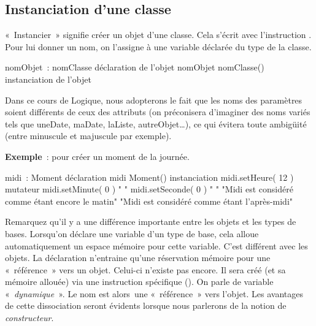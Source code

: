 	\subsection{Instanciation d'une classe}
	
		«~Instancier~» signifie créer un objet d'une classe.
		Cela s'écrit avec l'instruction
		. 
		Pour lui donner un nom, 
		on l'assigne à une variable déclarée du type de la
		classe.

		\begin{Pseudocode}
			\Decl nomObjet~: nomClasse 
			\RComment déclaration de l'objet
			\Let nomObjet \Gets {} nomClasse() 
			\RComment instanciation de l'objet
		\end{Pseudocode}

		Dans ce cours de Logique, nous adopterons le fait que 
		les noms des paramètres soient différents de ceux des 
		attributs (on préconisera d’imaginer des noms variés tels 
		que uneDate, maDate, laListe, autreObjet…), ce qui évitera 
		toute ambigüité (entre minuscule et majuscule par exemple).

		\textbf{Exemple}~: pour créer un moment de la journée.
		
		\begin{Pseudocode}
			\Module{test}{}{}
				\Decl midi~: Moment
				\RComment déclaration
				\Let midi \Gets \K{nouveau} Moment()
				\RComment instanciation
				\Stmt midi.setHeure( 12 )
				\RComment mutateur
				\Stmt midi.setMinute( 0 )
				\RComment " "
				\Stmt midi.setSeconde( 0 )
				\RComment " "
				\If{midi.estMatin()}
					\Write "Midi est considéré comme
					étant encore le matin"
				\Else 
					\Write "Midi est considéré comme
					étant l'après-midi"
				\EndIf
			\EndModule
		\end{Pseudocode}

		Remarquez qu'il y a une différence importante entre les
		objets et les types de bases. Lorsqu'on déclare une
		variable d'un type de base, cela alloue
		automatiquement un espace mémoire pour cette variable.
		C'est différent avec les objets. La déclaration
		n'entraine qu'une réservation mémoire
		pour une «~référence~» vers un objet. Celui-ci
		n'existe pas encore. Il sera créé (et sa mémoire
		allouée) via une instruction spécifique (). On
		parle de variable «\textit{~dynamique~}». Le nom est alors~une
		«~référence~» vers l’objet. Les avantages de cette dissociation seront
		évidents lorsque nous parlerons de la notion de \textit{constructeur}.

